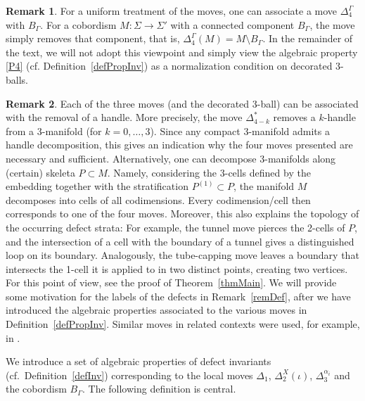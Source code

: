 \documentclass[pdftex]{sigma}
\numberwithin{equation}{section}
\theoremstyle{definition}
\newtheorem{Remark}[Remark]{Remark}
\begin{document}
\begin{Remark}
 For a uniform treatment of the moves, one can associate a move $\Delta_4^{\Gamma}$ with $B_{\Gamma}$. For a cobordism $M\colon \Sigma \rightarrow \Sigma'$ with a connected component $B_{\Gamma}$, the move simply removes that component, that is, $\Delta_4^{\Gamma}(M) = M \setminus B_{\Gamma}$. In the remainder of the text, we will not adopt this viewpoint and simply view the algebraic property \ref{P4} (cf. Definition~\ref{defPropInv}) as a normalization condition on decorated 3-balls.
\end{Remark}
\begin{Remark}
 Each of the three moves (and the decorated 3-ball) can be associated with the removal of a handle. More precisely, the move $\Delta_{4-k}^*$ removes a $k$-handle from a 3-manifold (for $k = 0, \dots, 3$). Since any compact 3-manifold admits a handle decomposition, this gives an indication why the four moves presented are necessary and sufficient. Alternatively, one can decompose 3-manifolds along (certain) skeleta $P \subset M$. Namely, considering the 3-cells defined by the embedding together with the stratification $P^{(1)} \subset P$, the manifold $M$ decomposes into cells of all codimensions. Every codimension/cell then corresponds to one of the four moves. Moreover, this also explains the topology of the occurring defect strata: For example, the tunnel move pierces the 2-cells of $P$, and the intersection of a cell with the boundary of a tunnel gives a distinguished loop on its boundary. Analogously, the tube-capping move leaves a boundary that intersects the 1-cell it is applied to in two distinct points, creating two vertices. For this point of view, see the proof of Theorem~\ref{thmMain}. We will provide some motivation for the labels of the defects in Remark~\ref{remDef}, after we have introduced the algebraic properties associated to the various moves in Definition~\ref{defPropInv}. Similar moves in related contexts were used, for example, in \cite{CGPT, LMWW, LMWW2, W}.
\end{Remark}
We introduce a set of algebraic properties of defect invariants (cf.\ Definition~\ref{defInv}) corresponding to the local moves $\Delta_1$, $\Delta_2^X(\iota)$, $\Delta_3^{\alpha_i}$ and the cobordism $B_{\Gamma}$. The following definition is central.
\end{document}
